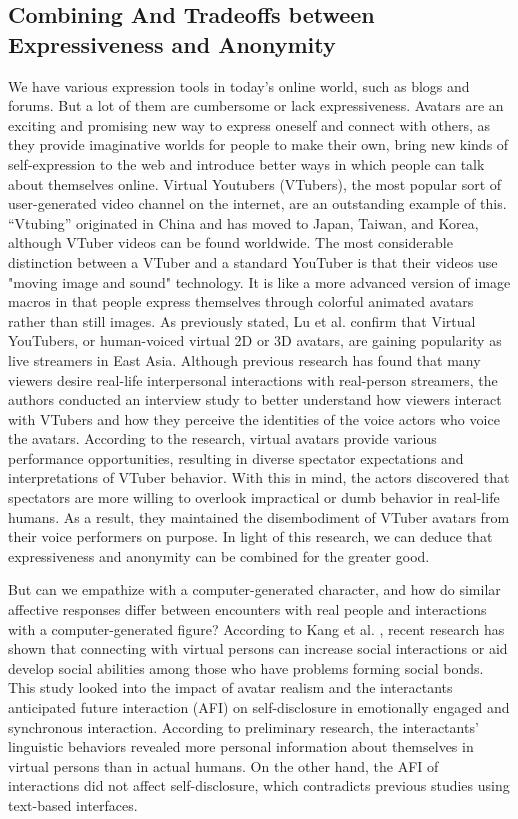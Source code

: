 \subsection{Combining And Tradeoffs between Expressiveness and Anonymity}
We have various expression tools in today's online world, such as blogs and forums. But a lot of them are cumbersome or lack expressiveness. Avatars are an exciting and promising new way to express oneself and connect with others, as they provide imaginative worlds for people to make their own, bring new kinds of self-expression to the web and introduce better ways in which people can talk about themselves online. Virtual Youtubers (VTubers), the most popular sort of user-generated video channel on the internet, are an outstanding example of this. “Vtubing” originated in China and has moved to Japan, Taiwan, and Korea, although VTuber videos can be found worldwide. The most considerable distinction between a VTuber and a standard YouTuber is that their videos use "moving image and sound" technology. It is like a more advanced version of image macros in that people express themselves through colorful animated avatars rather than still images. As previously stated, Lu et al. \cite{LU21} confirm that Virtual YouTubers, or human-voiced virtual 2D or 3D avatars, are gaining popularity as live streamers in East Asia. Although previous research has found that many viewers desire real-life interpersonal interactions with real-person streamers, the authors conducted an interview study to better understand how viewers interact with VTubers and how they perceive the identities of the voice actors who voice the avatars. According to the research, virtual avatars provide various performance opportunities, resulting in diverse spectator expectations and interpretations of VTuber behavior. With this in mind, the actors discovered that spectators are more willing to overlook impractical or dumb behavior in real-life humans. As a result, they maintained the disembodiment of VTuber avatars from their voice performers on purpose. In light of this research, we can deduce that expressiveness and anonymity can be combined for the greater good.

But can we empathize with a computer-generated character, and how do similar affective responses differ between encounters with real people and interactions with a computer-generated figure? According to Kang et al. \cite{KAN10A}, recent research has shown that connecting with virtual persons can increase social interactions or aid develop social abilities among those who have problems forming social bonds. This study looked into the impact of avatar realism and the interactants anticipated future interaction (AFI) on self-disclosure in emotionally engaged and synchronous interaction. According to preliminary research, the interactants' linguistic behaviors revealed more personal information about themselves in virtual persons than in actual humans. On the other hand, the AFI of interactions did not affect self-disclosure, which contradicts previous studies using text-based interfaces.

